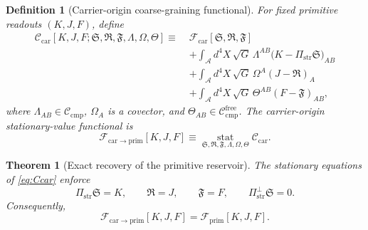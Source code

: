 \documentclass[11pt]{article}
\newcommand{\Sub}{\mathcal A}
\newcommand{\CompClass}{\mathscr C_{\mathrm{cmp}}}
\newcommand{\CompFree}{\mathscr C_{\mathrm{cmp}}^{\mathrm{free}}}
\newcommand{\PrimFunctional}{\mathscr F_{\mathrm{prim}}}
\newcommand{\CarrierFunctional}{\mathscr F_{\mathrm{car}}}
\newcommand{\CarrierToPrim}{\mathscr F_{\mathrm{car}\to\mathrm{prim}}}
\newcommand{\PrimStrain}{K}
\newcommand{\PrimNeutral}{J}
\newcommand{\PrimFree}{F}
\newcommand{\CarrierProj}{\Pi_{\mathrm{str}}}
\newcommand{\CarrierPerp}{\Pi_{\mathrm{str}}^{\perp}}
\newcommand{\CarrierSeed}{\mathfrak S}
\newcommand{\RelabelSeed}{\mathfrak R}
\newcommand{\FreeSeed}{\mathfrak F}
\newcommand{\StrainMult}{\Lambda}
\newcommand{\NeutralMult}{\Omega}
\newcommand{\FreeMult}{\Theta}
\newtheorem{definition}{Definition}
\newtheorem{theorem}{Theorem}
\begin{document}
\begin{definition}[Carrier-origin coarse-graining functional]
\label{def:carcg}
For fixed primitive readouts \((\PrimStrain,\PrimNeutral,\PrimFree)\), define
\begin{equation}
\begin{aligned}
\mathscr C_{\mathrm{car}}
[\PrimStrain,\PrimNeutral,\PrimFree;\CarrierSeed,\RelabelSeed,\FreeSeed,\StrainMult,\NeutralMult,\FreeMult]
\equiv\;
&\CarrierFunctional[\CarrierSeed,\RelabelSeed,\FreeSeed]
\\
&+\int_{\Sub} d^4X\,\sqrt{G}\,
\StrainMult^{AB}\bigl(\PrimStrain-\CarrierProj\CarrierSeed\bigr)_{AB}
\\
&+\int_{\Sub} d^4X\,\sqrt{G}\,
\NeutralMult^A(\PrimNeutral-\RelabelSeed)_A
\\
&+\int_{\Sub} d^4X\,\sqrt{G}\,
\FreeMult^{AB}(\PrimFree-\FreeSeed)_{AB},
\end{aligned}
\label{eq:Ccar}
\end{equation}
where \(\StrainMult_{AB}\in\CompClass\), \(\NeutralMult_A\) is a covector, and \(\FreeMult_{AB}\in\CompFree\). The carrier-origin stationary-value functional is
\begin{equation}
\CarrierToPrim[\PrimStrain,\PrimNeutral,\PrimFree]
\equiv
\operatorname*{stat}_{\CarrierSeed,\RelabelSeed,\FreeSeed,\StrainMult,\NeutralMult,\FreeMult}
\mathscr C_{\mathrm{car}}.
\label{eq:Fcarstat}
\end{equation}
\end{definition}

\begin{theorem}[Exact recovery of the primitive reservoir]
\label{thm:recoverprimitive}
The stationary equations of \eqref{eq:Ccar} enforce
\begin{equation}
\CarrierProj\CarrierSeed=\PrimStrain,
\qquad
\RelabelSeed=\PrimNeutral,
\qquad
\FreeSeed=\PrimFree,
\qquad
\CarrierPerp\CarrierSeed=0.
\label{eq:carconstraints}
\end{equation}
Consequently,
\begin{equation}
\CarrierToPrim[\PrimStrain,\PrimNeutral,\PrimFree]
=
\PrimFunctional[\PrimStrain,\PrimNeutral,\PrimFree].
\label{eq:primitiveexact}
\end{equation}
\end{theorem}
\end{document}
